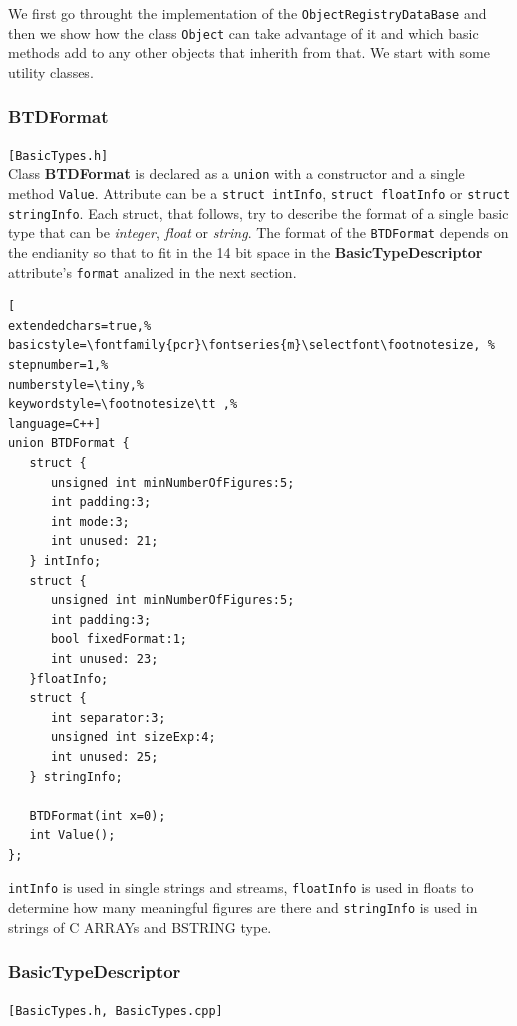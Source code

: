 We first go throught the implementation of the \texttt{ObjectRegistryDataBase} and then we show how the class \texttt{Object} can take advantage of it and which basic methods add to any other objects that inherith from that. We start with some utility classes.



\subsubsection{BTDFormat}
\texttt{[BasicTypes.h]}\\
Class \textbf{BTDFormat} is declared as a \texttt{union} with a constructor and a single method \texttt{Value}. Attribute can be a \texttt{struct intInfo}, \texttt{struct floatInfo} or \texttt{struct stringInfo}. Each struct, that follows, try to describe the format of a single basic type that can be \textit{integer}, \textit{float} or \textit{string}. The format of the \texttt{BTDFormat} depends on the endianity so that to fit in the 14 bit space in the \textbf{BasicTypeDescriptor} attribute's \texttt{format} analized in the next section.

\begin{lstlisting}[
extendedchars=true,%
basicstyle=\fontfamily{pcr}\fontseries{m}\selectfont\footnotesize, %
stepnumber=1,%
numberstyle=\tiny,%
keywordstyle=\footnotesize\tt ,%
language=C++]
union BTDFormat {
   struct {
      unsigned int minNumberOfFigures:5;
      int padding:3;
      int mode:3;
      int unused: 21;
   } intInfo;
   struct {
      unsigned int minNumberOfFigures:5;
      int padding:3;
      bool fixedFormat:1;
      int unused: 23;
   }floatInfo;
   struct {
      int separator:3;
      unsigned int sizeExp:4;
      int unused: 25;
   } stringInfo;

   BTDFormat(int x=0);
   int Value();
};
\end{lstlisting}

\texttt{intInfo} is used in single strings and streams, \texttt{floatInfo} is used in floats to determine how many meaningful figures are there and \texttt{stringInfo} is used in strings of C ARRAYs and BSTRING type.



\subsubsection{BasicTypeDescriptor}
\texttt{[BasicTypes.h, BasicTypes.cpp]}\\

